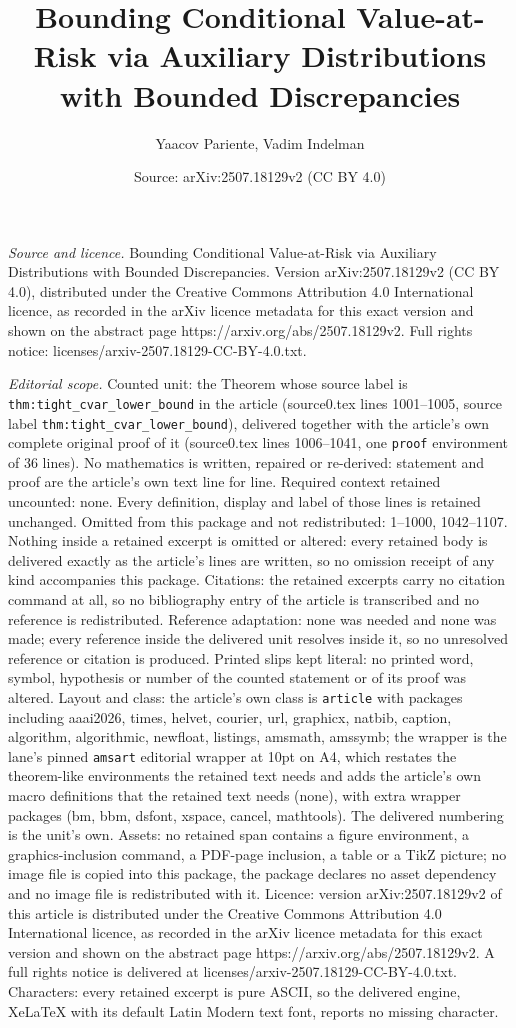 \documentclass[10pt,a4paper]{amsart}
\title[Bounding Conditional Value-at-Risk via Auxiliary Distributio]{Bounding Conditional Value-at-Risk via Auxiliary Distributions with Bounded Discrepancies}
\author{Yaacov Pariente, Vadim Indelman}
\date{Source: arXiv:2507.18129v2 (CC BY 4.0)}
\begin{document}
\maketitle

\noindent\emph{Source and licence.} Bounding Conditional Value-at-Risk via Auxiliary Distributions with Bounded Discrepancies. Version arXiv:2507.18129v2 (CC BY 4.0), distributed under the Creative Commons Attribution 4.0 International licence, as recorded in the arXiv licence metadata for this exact version and shown on the abstract page https://arxiv.org/abs/2507.18129v2. Full rights notice: licenses/arxiv-2507.18129-CC-BY-4.0.txt.\par\smallskip

\noindent\textit{Editorial scope.} Counted unit: the Theorem whose source label is \texttt{thm:tight\_cvar\_lower\_bound} in the article (source0.tex lines 1001--1005, source label \texttt{thm:tight\_cvar\_lower\_bound}), delivered together with the article's own complete original proof of it (source0.tex lines 1006--1041, one \texttt{proof} environment of 36 lines). No mathematics is written, repaired or re-derived: statement and proof are the article's own text line for line. Required context retained uncounted: none. Every definition, display and label of those lines is retained unchanged. Omitted from this package and not redistributed: 1--1000, 1042--1107. Nothing inside a retained excerpt is omitted or altered: every retained body is delivered exactly as the article's lines are written, so no omission receipt of any kind accompanies this package. Citations: the retained excerpts carry no citation command at all, so no bibliography entry of the article is transcribed and no reference is redistributed. Reference adaptation: none was needed and none was made; every reference inside the delivered unit resolves inside it, so no unresolved reference or citation is produced. Printed slips kept literal: no printed word, symbol, hypothesis or number of the counted statement or of its proof was altered. Layout and class: the article's own class is \texttt{article} with packages including aaai2026, times, helvet, courier, url, graphicx, natbib, caption, algorithm, algorithmic, newfloat, listings, amsmath, amssymb; the wrapper is the lane's pinned \texttt{amsart} editorial wrapper at 10pt on A4, which restates the theorem-like environments the retained text needs and adds the article's own macro definitions that the retained text needs (none), with extra wrapper packages (bm, bbm, dsfont, xspace, cancel, mathtools). The delivered numbering is the unit's own. Assets: no retained span contains a figure environment, a graphics-inclusion command, a PDF-page inclusion, a table or a TikZ picture; no image file is copied into this package, the package declares no asset dependency and no image file is redistributed with it. Licence: version arXiv:2507.18129v2 of this article is distributed under the Creative Commons Attribution 4.0 International licence, as recorded in the arXiv licence metadata for this exact version and shown on the abstract page https://arxiv.org/abs/2507.18129v2. A full rights notice is delivered at licenses/arxiv-2507.18129-CC-BY-4.0.txt. Characters: every retained excerpt is pure ASCII, so the delivered engine, XeLaTeX with its default Latin Modern text font, reports no missing character.
\end{document}
